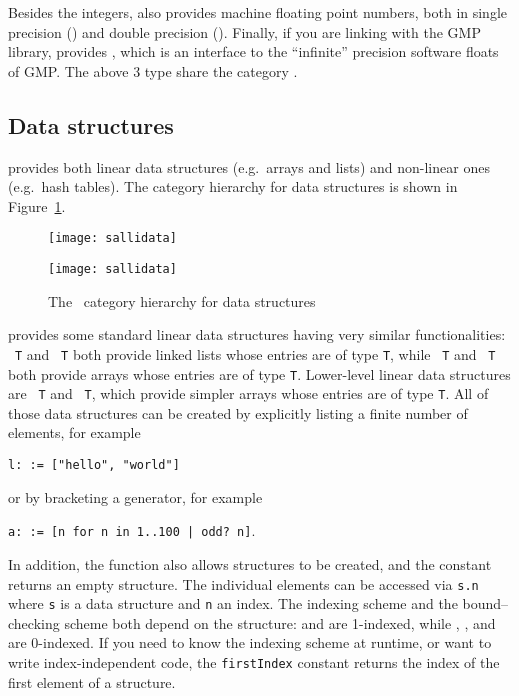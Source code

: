 Besides the integers, \libaldor{} also provides machine floating point numbers,
both in single precision () and double precision
(). Finally, if you are linking with the
GMP library, \libaldor{} provides , which is an interface
to the ``infinite'' precision software floats of GMP.
The above 3 type share the category .

\subsection{Data structures}
\libaldor{} provides both linear data structures (e.g.~arrays and lists)
and non-linear ones (e.g.~hash tables). The category hierarchy for
data structures is shown in Figure~\ref{fig:data}.

\begin{figure}[htb!]
\begin{latexonly}
\texttt{[image: sallidata]}
\end{latexonly}
\begin{htmlonly}
\texttt{[image: sallidata]}
\end{htmlonly}
\caption{The \libaldor~category hierarchy for data structures}
\label{fig:data}
\end{figure}

\libaldor{} provides some standard linear
data structures having very similar functionalities:
~{\tt T} and ~{\tt T}
both provide linked lists
whose entries are of type {\tt T}, while
~{\tt T} and ~{\tt T} both provide
arrays whose entries are of type {\tt T}.
Lower-level linear data structures are ~{\tt T}
and ~{\tt T},
which provide simpler arrays whose entries are of type {\tt T}.
All of those data structures can be created by explicitly listing a
finite number of elements, for example\\
\centerline{{\tt l:  := ["hello", "world"] }}
or by bracketing a generator, for example\\
\centerline{ {\tt a:  :=
[n for n in 1..100 | odd?~n]}.}
In addition, the function 
also allows structures to be created, and the constant
returns an empty structure. The individual elements can
be accessed via {\tt s.n} where {\tt s} is a data structure and
{\tt n} an index. The indexing scheme and the bound--checking scheme
both depend on the structure:
 and  are 1-indexed, while
, , 
and  are 0-indexed.
If you need to know the indexing scheme at runtime,
or want to write index-independent code, the {\tt firstIndex} constant
returns the index of the first element of a structure.


